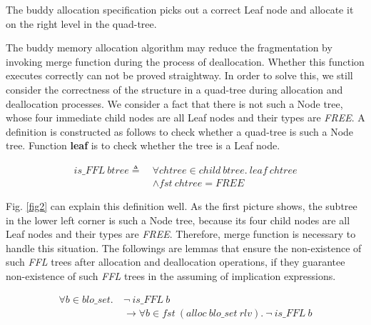 \begin{theorem}
The buddy allocation specification picks out a correct Leaf node and allocate it on the right level in the quad-tree.
\end{theorem}

The buddy memory allocation algorithm may reduce the fragmentation by invoking merge function during the process of deallocation. Whether this function executes correctly can not be proved straightway. In order to solve this, we still consider the correctness of the structure in a quad-tree during allocation and deallocation processes. We consider a fact that there is not such a Node tree, whose four immediate child nodes are all Leaf nodes and their types are \emph{FREE}. A definition is constructed as follows to check whether a quad-tree is such a Node tree. Function \textbf{leaf} is to check whether the tree is a Leaf node.

\begin{definition} 
\end{definition}
\vspace{-7pt}
{\footnotesize
\begin{align*}
is\_FFL\ btree \triangleq\ &\forall chtree \in child\ btree.\ leaf\ chtree \\
&\wedge fst\ chtree = FREE
\end{align*}
}
\vspace{-12pt}

Fig. \ref{fig2} can explain this definition well. As the first picture shows, the subtree in the lower left corner is such a Node tree, because its four child nodes are all Leaf nodes and their types are \emph{FREE}. Therefore, merge function is necessary to handle this situation. The followings are lemmas that ensure the non-existence of such \emph{FFL} trees after allocation and deallocation operations, if they guarantee non-existence of such \emph{FFL} trees in the assuming of implication expressions.

\begin{lemma} 
\label{allocffl}
\end{lemma}
\vspace{-7pt}
{\footnotesize
\begin{align*}
\forall b \in blo\_set.\ &\neg\ is\_FFL\ b \\
&\longrightarrow \forall b \in fst\ (alloc\ blo\_set\ rlv).\ \neg\ is\_FFL\ b
\end{align*}
}
\vspace{-12pt}


